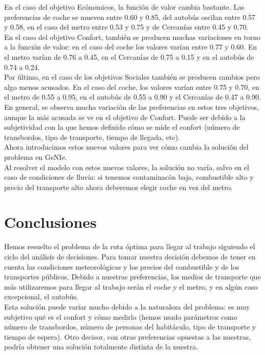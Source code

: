 \documentclass[12pt,a4paper,twoside,openright,titlepage,final]{article}
\begin{document}
En el caso del objetivo Ecónomicos, la función de valor cambia bastante. Las preferencias de coche se mueven entre 0.60 y 0.85, del autobús oscilan entre 0.57 y 0.58, en el caso del metro entre 0.53 y 0.75 y de Cercanías entre 0.45 y 0.70.\\

En el caso del objetivo Confort, también se producen muchas variaciones en torno a la función de valor: en el caso del coche los valores varían entre 0.77 y 0.60. En el metro varían de 0.76 a 0.45, en el Cercanías de 0.75 a 0.15 y en el autobús de 0.74 a 0.24.\\

Por último, en el caso de los objetivos Sociales también se producen cambios pero algo menos acusados. En el caso del coche, los valores varían entre 0.75 y 0.70, en el metro de 0.55 a 0.95, en el autobús de 0.55 a 0.90 y el Cercanías de 0.47 a 0.90.\\

En general, se observa mucha variación de las preferencias en estos tres objetivos, aunque la más acusada se ve en el objetivo de Confort. Puede ser debido a la subjetividad con la que hemos definido cómo se mide el confort (número de transbordos, tipo de transporte, tiempo de llegada, etc).\\

Ahora introducimos estos nuevos valores para ver cómo cambia la solución del problema en GeNIe.\\

Al resolver el modelo con estos nuevos valores, la solución no varía, salvo en el caso de condiciones de lluvia: si tenemos contaminacón baja, combustible alto y precio del transporte alto ahora deberemos elegir coche en vez del metro.

\section{Conclusiones}

Hemos resuelto el problema de la ruta óptima para llegar al trabajo siguiendo el ciclo del análisis de decisiones. Para tomar nuestra decisión debemos de tener en cuenta las condiciones meteorológicas y los precios del combustible y de los transportes públicos. Debido a nuestras preferencias, los medios de transporte que más utilizaremos para llegar al trabajo serán el coche y el metro, y en algún caso excepcional, el autobús.\\

Esta solución puede variar mucho debido a la naturaleza del problema: es muy subjetivo qué es el confort y cómo medirlo (hemos usado parámetros como número de transbordos, número de personas del habitáculo, tipo de transporte y tiempo de espera). Otro decisor, con otras preferencias opuestas a las nuestras, podría obtener una solución totalmente distinta de la nuestra.\\
\end{document}
